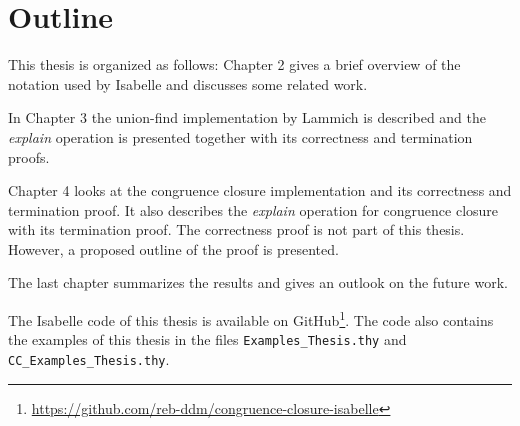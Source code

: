 \section{Outline}
This thesis is organized as follows: Chapter 2 gives a brief overview of the notation used by Isabelle and discusses some related work.

In Chapter 3 the union-find implementation by Lammich \cite{unionfind-isabelle} is described and the \emph{explain} operation is presented together with its correctness and termination proofs.

Chapter 4 looks at the congruence closure implementation and its correctness and termination proof. It also describes the \emph{explain} operation for congruence closure with its termination proof. The correctness proof is not part of this thesis. However, a proposed outline of the proof is presented.

The last chapter summarizes the results and gives an outlook on the future work.

The Isabelle code of this thesis is available on GitHub\footnote{\url{https://github.com/reb-ddm/congruence-closure-isabelle}}.
The code also contains the examples of this thesis in the files \lstinline|Examples_Thesis.thy| and \lstinline|CC_Examples_Thesis.thy|.

